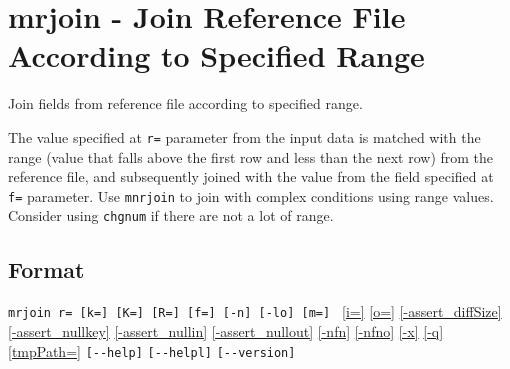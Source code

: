
%

\section{mrjoin - Join Reference File According to Specified Range\label{sect:mrjoin}}

Join fields from reference file according to specified range. 

The value specified at \verb|r=| parameter from the input data is matched with the range (value that falls above the first row and less than the next row) from the reference file, and subsequently joined with the value from the field specified at \verb|f=| parameter. 
Use \verb|mnrjoin| to join with complex conditions using range values. Consider using \verb|chgnum| if there are not a lot of range. 


\subsection*{Format}
\verb/mrjoin r= [k=] [K=] [R=] [f=] [-n] [-lo] [m=] /
\hyperref[sect:option_i]{[i=]}
\hyperref[sect:option_o]{[o=]}
\hyperref[sect:option_assert_diffSize]{[-assert\_diffSize]}
\hyperref[sect:option_assert_nullkey]{[-assert\_nullkey]}
\hyperref[sect:option_assert_nullin]{[-assert\_nullin]}
\hyperref[sect:option_assert_nullout]{[-assert\_nullout]}
\hyperref[sect:option_nfn]{[-nfn]} 
\hyperref[sect:option_nfno]{[-nfno]}  
\hyperref[sect:option_x]{[-x]}
\hyperref[sect:option_q]{[-q]}
\hyperref[sect:option_option_tmppath]{[tmpPath=]}
\verb|[--help]|
\verb|[--helpl]|
\verb|[--version]|\\

